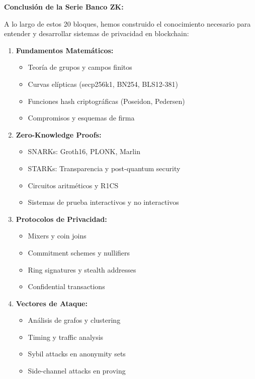 \documentclass[11pt,a4paper,twoside]{book}
\theoremstyle{definition}
\theoremstyle{remark}
\begin{document}
\begin{keyidea}
\textbf{Conclusión de la Serie Banco ZK:}

A lo largo de estos 20 bloques, hemos construido el conocimiento necesario para entender y desarrollar sistemas de privacidad en blockchain:

\begin{enumerate}
    \item \textbf{Fundamentos Matemáticos:} 
    \begin{itemize}
        \item Teoría de grupos y campos finitos
        \item Curvas elípticas (secp256k1, BN254, BLS12-381)
        \item Funciones hash criptográficas (Poseidon, Pedersen)
        \item Compromisos y esquemas de firma
    \end{itemize}
    
    \item \textbf{Zero-Knowledge Proofs:} 
    \begin{itemize}
        \item SNARKs: Groth16, PLONK, Marlin
        \item STARKs: Transparencia y post-quantum security
        \item Circuitos aritméticos y R1CS
        \item Sistemas de prueba interactivos y no interactivos
    \end{itemize}
    
    \item \textbf{Protocolos de Privacidad:} 
    \begin{itemize}
        \item Mixers y coin joins
        \item Commitment schemes y nullifiers
        \item Ring signatures y stealth addresses
        \item Confidential transactions
    \end{itemize}
    
    \item \textbf{Vectores de Ataque:} 
    \begin{itemize}
        \item Análisis de grafos y clustering
        \item Timing y traffic analysis
        \item Sybil attacks en anonymity sets
        \item Side-channel attacks en proving
    \end{itemize}
    

\end{enumerate}
\end{keyidea}
\end{document}
